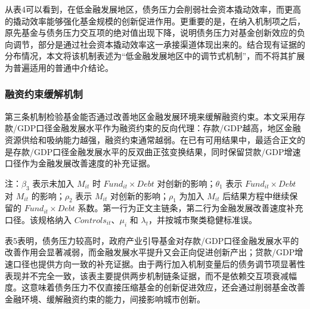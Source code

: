 从表4可以看到，在低金融发展地区，债务压力会削弱社会资本撬动效率，而更高的撬动效率能够强化基金规模的创新促进作用。更重要的是，在纳入机制项之后，原先基金与债务压力交互项的绝对值出现下降，说明债务压力对基金创新效应的负向调节，部分是通过社会资本撬动效率这一承接渠道体现出来的。结合现有证据的分布情况，本文将该机制表述为“低金融发展地区中的调节式机制”，而不将其扩展为普遍适用的普通中介结论。

\subsubsection{融资约束缓解机制}

第三条机制检验基金能否通过改善地区金融发展环境来缓解融资约束。本文采用存款/GDP口径金融发展水平作为融资约束的反向代理：存款/GDP越高，地区金融资源供给和吸纳能力越强，融资约束通常越弱。在已有可用结果中，最适合正文的是存款/GDP口径金融发展水平的反双曲正弦变换结果，同时保留贷款/GDP增速口径作为金融发展改善速度的补充证据。

\begin{table}[htbp]
  \centering
  \caption{融资约束缓解机制：金融发展水平与增速}
  {\fangsong{}

  \par\smallskip
  {\songti{}注：$\beta_3$ 表示未加入 $M_{it}$ 时 $Fund_{it}\times Debt$ 对创新的影响；$\theta_1$ 表示 $Fund_{it}\times Debt$ 对 $M_{it}$ 的影响；$\rho_2$ 表示 $M_{it}$ 对创新的影响；$\rho_1$ 为加入 $M_{it}$ 后结果方程中继续保留的 $Fund_{it}\times Debt$ 系数。第一行为正文主链条，第二行为金融发展改善速度补充口径。该规格纳入 $Controls_{it}$、$\mu_i$ 和 $\lambda_t$，并按城市聚类稳健标准误。}
  }
\end{table}

表5表明，债务压力较高时，政府产业引导基金对存款/GDP口径金融发展水平的改善作用会显著减弱，而金融发展水平提升又会正向促进创新产出；贷款/GDP增速口径也提供方向一致的补充证据。由于两行加入机制变量后的债务调节项显著性表现并不完全一致，该表主要提供两步机制链条证据，而不是依赖交互项衰减幅度。这意味着债务压力不仅直接压缩基金的创新促进效应，还会通过削弱基金改善金融环境、缓解融资约束的能力，间接影响城市创新。

